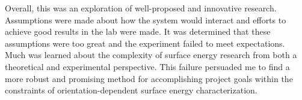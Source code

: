 Overall, this was an exploration of well-proposed and innovative research. Assumptions were made about how the system would interact and efforts to achieve good results in the lab were made. It was determined that these assumptions were too great and the experiment failed to meet expectations. Much was learned about the complexity of surface energy research from both a theoretical and experimental perspective. This failure persuaded me to find a more robust and promising method for accomplishing project goals within the constraints of orientation-dependent surface energy characterization. 

